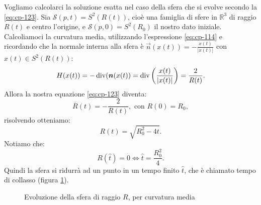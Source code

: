 \begin{esempio}
Vogliamo calcolarci la soluzione esatta nel caso della sfera che si evolve secondo la \eqref{eq:cp-123}. Sia $\mathcal{S}(p,t) = S^2(R(t))$, cioè una famiglia di sfere in $\mathbb{R}^3$ di raggio $R(t)$ e centro l'origine, e $\mathcal{S}(p,0) = S^2(R_0)$ il nostro dato iniziale. Calcoliamoci la curvatura media, utilizzando l'espressione \eqref{eq:cp-114} e ricordando che la normale interna alla sfera è $\vec{n}(x(t))=-\frac{x(t)}{|x(t)|}$ con $x(t)\in S^2(R(t))$:
\[
H(x(t)) =-\operatorname{div}(\bm{n}(x(t))=\operatorname{div}\left(\frac{x(t)}{|x(t)|}\right)=\frac{2}{R(t)}.   
\]
Allora la nostra equazione \eqref{eq:cp-123} diventa:
\[
\overset{.}{R}(t)=-\frac{2}{R(t)}, \text{ con } R(0) = R_0,
\]
risolvendo otteniamo:
\[
R(t)=\sqrt{R_0^2-4t}.
\]
Notiamo che:
\[
R(\hat{t})=0 \Longleftrightarrow \hat{t}=\frac{R_0^2}{4}.
\]
Quindi la sfera si ridurrà ad un punto in un tempo finito $\hat{t}$, che è chiamato tempo di collasso (figura \ref{fig:cp-121}).

\begin{figure}[!hp]
  \begin{center}
  \end{center}
  \caption{Evoluzione della sfera di raggio $R$, per curvatura media}
  \label{fig:cp-121}
\end{figure}
\end{esempio}

